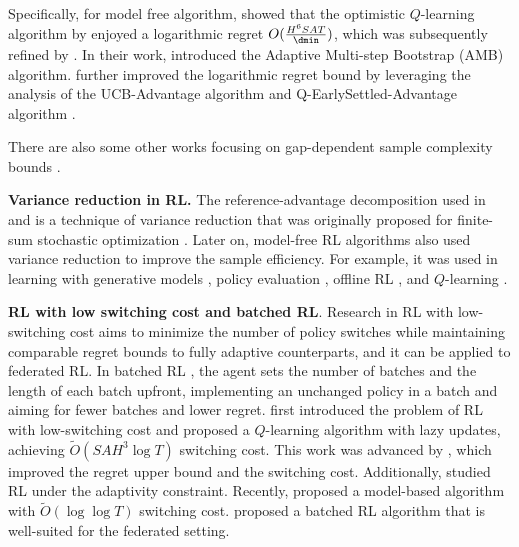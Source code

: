 Specifically, for model free algorithm, \citet{yang2021q} showed that the optimistic $Q$-learning algorithm by \citet{jin2018q} enjoyed a logarithmic regret $O(\frac{H^6SAT}{\dmin})$, which was subsequently refined by \citet{xu2021fine}. In their work, \citet{xu2021fine} introduced the Adaptive Multi-step Bootstrap (AMB) algorithm. \citet{zheng2024gap} further improved the logarithmic regret bound by leveraging the analysis of the UCB-Advantage algorithm \citep{zhang2020almost} and Q-EarlySettled-Advantage algorithm \citep{li2021breaking}.

There are also some other works focusing on gap-dependent sample complexity bounds
\citep{jonsson2020planning, marjani2020best, al2021navigating, tirinzoni2022near, wagenmaker2022beyond, wagenmaker2022instance, wang2022gap, tirinzoni2023optimistic}.

\textbf{Variance reduction in RL.} The reference-advantage decomposition used in \citet{zhang2020almost} and \citet{li2021breaking} is a technique of variance reduction that was originally proposed for finite-sum stochastic optimization  \citep{gower2020variance,johnson2013accelerating,nguyen2017sarah}. Later on, model-free RL algorithms also used variance reduction to improve the sample efficiency. For example, it was used in learning with generative models \citep{sidford2018near,sidford2023variance,wainwright2019variance}, policy evaluation \citep{du2017stochastic,khamaru2021temporal,wai2019variance,xu2020reanalysis}, offline RL \citep{shi2022pessimistic,yin2021near}, and $Q$-learning \citep{li2020sample,zhang2020almost,li2021breaking,yan2022efficacy}.

\textbf{RL with low switching cost and batched RL}. Research in RL with low-switching cost aims to minimize the number of policy switches while maintaining comparable regret bounds to fully adaptive counterparts, and it can be applied to federated RL. In batched RL \citep{perchet2016batched, gao2019batched}, the agent sets the number of batches and the length of each batch upfront, implementing an unchanged policy in a batch and aiming for fewer batches and lower regret. \citet{bai2019provably} first introduced the problem of RL with low-switching cost and proposed a $Q$-learning algorithm with lazy updates, achieving $\tilde{O}(SAH^3\log T)$ switching cost. This work was advanced by \citet{zhang2020almost}, which improved the regret upper bound and the switching cost. Additionally, \citet{wang2021provably} studied RL under the adaptivity constraint. 
Recently, \citet{qiao2022sample} proposed a model-based algorithm with $\tilde{O}(\log \log T)$ switching cost. \citet{zhang2022near} proposed a batched RL algorithm that is well-suited for the federated setting. 

